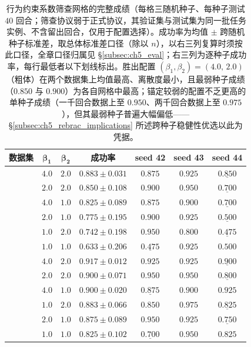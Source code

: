 \begin{table}[t]
\centering
\caption{行为约束系数筛查网格的完整成绩（每格三随机种子、每种子测试 $40$ 回合；筛查协议弱于正式协议，其验证集与测试集为同一批任务实例、不含留出回合，仅用于配置选择）。成功率为均值 $\pm$ 跨随机种子标准差，取总体标准差口径（除以 $n$），以右三列复算时须按此口径，全章口径归属见 \S\ref{subsec:ch5_eval}；右三列为逐种子成功率，每行最低者以下划线标出。胜出配置 $(\beta_1,\beta_2)=(4.0,\,2.0)$（粗体）在两个数据集上均值最高、离散度最小，且最弱种子成绩（$0.850$ 与 $0.900$）为各自网格中最高；锚定较弱的配置不乏更高的单种子成绩（一千回合数据上至 $0.950$、两千回合数据上至 $0.975$），但其最弱种子普遍大幅偏低——\S\ref{subsec:ch5_rebrac_implications} 所述跨种子稳健性优选以此为凭据。}
\label{tab:ch5_rebrac_screen}
\setlength{\tabcolsep}{5pt}
\begin{tabular}{l c c c c c c}
\toprule
\textbf{数据集} & $\boldsymbol{\beta_1}$ & $\boldsymbol{\beta_2}$ & \textbf{成功率} & \textbf{seed 42} & \textbf{seed 43} & \textbf{seed 44} \\
\midrule
{}
 & $\mathbf{4.0}$ & $\mathbf{2.0}$ & $\mathbf{0.883 \pm 0.031}$ & $0.875$ & $0.925$ & $\underline{0.850}$ \\
 & $2.0$ & $2.0$ & $0.850 \pm 0.108$ & $0.900$ & $0.950$ & $\underline{0.700}$ \\
 & $4.0$ & $1.0$ & $0.825 \pm 0.089$ & $0.875$ & $0.900$ & $\underline{0.700}$ \\
 & $2.0$ & $1.0$ & $0.775 \pm 0.195$ & $0.900$ & $0.925$ & $\underline{0.500}$ \\
 & $1.0$ & $2.0$ & $0.742 \pm 0.198$ & $0.950$ & $0.800$ & $\underline{0.475}$ \\
 & $1.0$ & $1.0$ & $0.633 \pm 0.206$ & $\underline{0.475}$ & $0.925$ & $0.500$ \\
\addlinespace
{}
 & $\mathbf{4.0}$ & $\mathbf{2.0}$ & $\mathbf{0.917 \pm 0.012}$ & $0.925$ & $0.925$ & $\underline{0.900}$ \\
 & $2.0$ & $2.0$ & $0.900 \pm 0.071$ & $0.950$ & $0.950$ & $\underline{0.800}$ \\
 & $4.0$ & $1.0$ & $0.900 \pm 0.020$ & $\underline{0.875}$ & $0.900$ & $0.925$ \\
 & $1.0$ & $2.0$ & $0.883 \pm 0.066$ & $0.850$ & $0.975$ & $\underline{0.825}$ \\
 & $2.0$ & $1.0$ & $0.875 \pm 0.089$ & $0.950$ & $0.925$ & $\underline{0.750}$ \\
 & $1.0$ & $1.0$ & $0.825 \pm 0.102$ & $\underline{0.700}$ & $0.950$ & $0.825$ \\
\bottomrule
\end{tabular}
\end{table}

